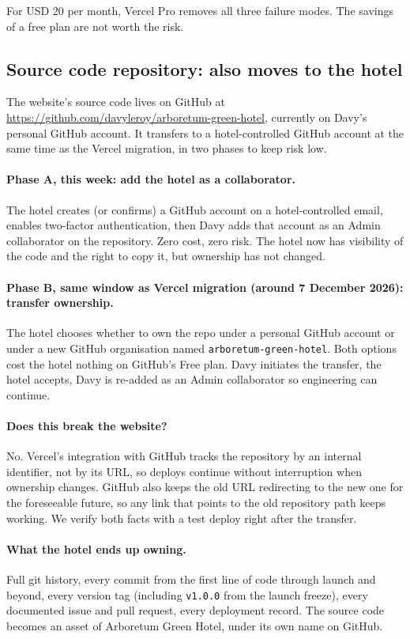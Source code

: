 \documentclass[11pt,a4paper]{article}
\begin{document}
For USD 20 per month, Vercel Pro removes all three failure modes. The savings of a free plan are not worth the risk.

\subsection{Source code repository: also moves to the hotel}

The website's source code lives on GitHub at \url{https://github.com/davyleroy/arboretum-green-hotel}, currently on Davy's personal GitHub account. It transfers to a hotel-controlled GitHub account at the same time as the Vercel migration, in two phases to keep risk low.

\paragraph{Phase A, this week: add the hotel as a collaborator.}
The hotel creates (or confirms) a GitHub account on a hotel-controlled email, enables two-factor authentication, then Davy adds that account as an Admin collaborator on the repository. Zero cost, zero risk. The hotel now has visibility of the code and the right to copy it, but ownership has not changed.

\paragraph{Phase B, same window as Vercel migration (around 7 December 2026): transfer ownership.}
The hotel chooses whether to own the repo under a personal GitHub account or under a new GitHub organisation named \texttt{arboretum-green-hotel}. Both options cost the hotel nothing on GitHub's Free plan. Davy initiates the transfer, the hotel accepts, Davy is re-added as an Admin collaborator so engineering can continue.

\paragraph{Does this break the website?} No. Vercel's integration with GitHub tracks the repository by an internal identifier, not by its URL, so deploys continue without interruption when ownership changes. GitHub also keeps the old URL redirecting to the new one for the foreseeable future, so any link that points to the old repository path keeps working. We verify both facts with a test deploy right after the transfer.

\paragraph{What the hotel ends up owning.}
Full git history, every commit from the first line of code through launch and beyond, every version tag (including \texttt{v1.0.0} from the launch freeze), every documented issue and pull request, every deployment record. The source code becomes an asset of Arboretum Green Hotel, under its own name on GitHub.
\end{document}
